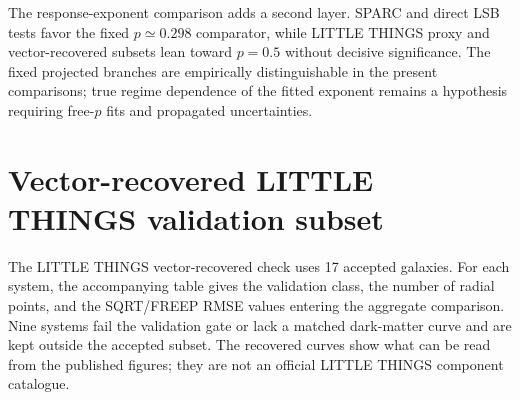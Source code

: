 ﻿\documentclass[twocolumn]{aastex631}
\begin{document}
The response-exponent comparison adds a second layer.  SPARC and direct LSB tests favor the fixed $p\simeq0.298$ comparator, while LITTLE THINGS proxy and vector-recovered subsets lean toward $p=0.5$ without decisive significance.  The fixed projected branches are empirically distinguishable in the present comparisons; true regime dependence of the fitted exponent remains a hypothesis requiring free-$p$ fits and propagated uncertainties.

\appendix
\section{Vector-recovered LITTLE THINGS validation subset}
The LITTLE THINGS vector-recovered check uses 17 accepted galaxies.  For each system, the accompanying table gives the validation class, the number of radial points, and the SQRT/FREEP RMSE values entering the aggregate comparison.  Nine systems fail the validation gate or lack a matched dark-matter curve and are kept outside the accepted subset.  The recovered curves show what can be read from the published figures; they are not an official LITTLE THINGS component catalogue.

\begingroup
\scriptsize


\endgroup
\end{document}
